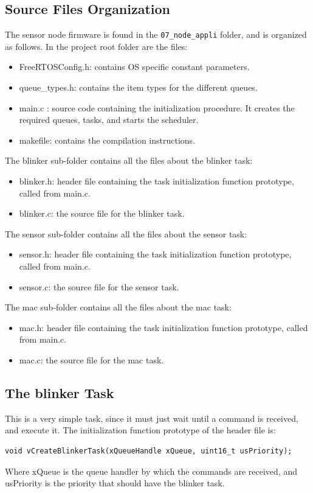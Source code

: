 \documentclass[11pt]{report}
\begin{document}
\subsection{Source Files Organization}

The sensor node firmware is found in the \verb$07_node_appli$ folder, and is organized as follows. In the project root folder are the files:
\begin{itemize}
	\item FreeRTOSConfig.h: contains OS specific constant parameters.
	\item queue\_types.h: contains the item types for the different queues.
	\item main.c : source code containing the initialization procedure. It creates the required queues, tasks, and starts the scheduler.
	\item makefile: contains the compilation instructions.
\end{itemize}

The blinker sub-folder contains all the files about the blinker task:
\begin{itemize}
	\item blinker.h: header file containing the task initialization function prototype, called from main.c.
	\item blinker.c: the source file for the blinker task.
\end{itemize}

The sensor sub-folder contains all the files about the sensor task:
\begin{itemize}
	\item sensor.h: header file containing the task initialization function prototype, called from main.c.
	\item sensor.c: the source file for the sensor task.
\end{itemize}


The mac sub-folder contains all the files about the mac task:
\begin{itemize}
	\item mac.h: header file containing the task initialization function prototype, called from main.c.
	\item mac.c: the source file for the mac task.
\end{itemize}

\subsection{The blinker Task}
This is a very simple task, since it must just wait until a command is received, and execute it. The initialization function prototype of the header file is:
\begin{verbatim}
void vCreateBlinkerTask(xQueueHandle xQueue, uint16_t usPriority);
\end{verbatim}
Where xQueue is the queue handler by which the commands are received, and usPriority is the priority that should have the blinker task.
\end{document}
